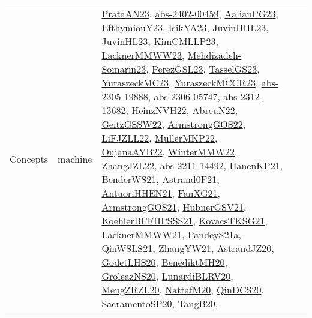 {\begin{longtable}{lp{3cm}>{\raggedright}p{6cm}>{\raggedright}p{6cm}p{8cm}}
Concepts & machine & \href{articles/PrataAN23.pdf}{PrataAN23}\cite{PrataAN23}, \href{articles/abs-2402-00459.pdf}{abs-2402-00459}\cite{abs-2402-00459}, \href{papers/AalianPG23.pdf}{AalianPG23}\cite{AalianPG23}, \href{papers/EfthymiouY23.pdf}{EfthymiouY23}\cite{EfthymiouY23}, \href{articles/IsikYA23.pdf}{IsikYA23}\cite{IsikYA23}, \href{papers/JuvinHHL23.pdf}{JuvinHHL23}\cite{JuvinHHL23}, \href{papers/JuvinHL23.pdf}{JuvinHL23}\cite{JuvinHL23}, \href{papers/KimCMLLP23.pdf}{KimCMLLP23}\cite{KimCMLLP23}, \href{articles/LacknerMMWW23.pdf}{LacknerMMWW23}\cite{LacknerMMWW23}, \href{papers/Mehdizadeh-Somarin23.pdf}{Mehdizadeh-Somarin23}\cite{Mehdizadeh-Somarin23}, \href{papers/PerezGSL23.pdf}{PerezGSL23}\cite{PerezGSL23}, \href{papers/TasselGS23.pdf}{TasselGS23}\cite{TasselGS23}, \href{papers/YuraszeckMC23.pdf}{YuraszeckMC23}\cite{YuraszeckMC23}, \href{articles/YuraszeckMCCR23.pdf}{YuraszeckMCCR23}\cite{YuraszeckMCCR23}, \href{articles/abs-2305-19888.pdf}{abs-2305-19888}\cite{abs-2305-19888}, \href{articles/abs-2306-05747.pdf}{abs-2306-05747}\cite{abs-2306-05747}, \href{articles/abs-2312-13682.pdf}{abs-2312-13682}\cite{abs-2312-13682}, \href{articles/HeinzNVH22.pdf}{HeinzNVH22}\cite{HeinzNVH22}, \href{articles/AbreuN22.pdf}{AbreuN22}\cite{AbreuN22}, \href{papers/GeitzGSSW22.pdf}{GeitzGSSW22}\cite{GeitzGSSW22}, \href{papers/ArmstrongGOS22.pdf}{ArmstrongGOS22}\cite{ArmstrongGOS22}, \href{papers/LiFJZLL22.pdf}{LiFJZLL22}\cite{LiFJZLL22}, \href{articles/MullerMKP22.pdf}{MullerMKP22}\cite{MullerMKP22}, \href{papers/OujanaAYB22.pdf}{OujanaAYB22}\cite{OujanaAYB22}, \href{papers/WinterMMW22.pdf}{WinterMMW22}\cite{WinterMMW22}, \href{papers/ZhangJZL22.pdf}{ZhangJZL22}\cite{ZhangJZL22}, \href{articles/abs-2211-14492.pdf}{abs-2211-14492}\cite{abs-2211-14492}, \href{papers/HanenKP21.pdf}{HanenKP21}\cite{HanenKP21}, \href{papers/BenderWS21.pdf}{BenderWS21}\cite{BenderWS21}, \href{papers/Astrand0F21.pdf}{Astrand0F21}\cite{Astrand0F21}, \href{papers/AntuoriHHEN21.pdf}{AntuoriHHEN21}\cite{AntuoriHHEN21}, \href{articles/FanXG21.pdf}{FanXG21}\cite{FanXG21}, \href{papers/ArmstrongGOS21.pdf}{ArmstrongGOS21}\cite{ArmstrongGOS21}, \href{articles/HubnerGSV21.pdf}{HubnerGSV21}\cite{HubnerGSV21}, \href{articles/KoehlerBFFHPSSS21.pdf}{KoehlerBFFHPSSS21}\cite{KoehlerBFFHPSSS21}, \href{papers/KovacsTKSG21.pdf}{KovacsTKSG21}\cite{KovacsTKSG21}, \href{papers/LacknerMMWW21.pdf}{LacknerMMWW21}\cite{LacknerMMWW21}, \href{articles/PandeyS21a.pdf}{PandeyS21a}\cite{PandeyS21a}, \href{articles/QinWSLS21.pdf}{QinWSLS21}\cite{QinWSLS21}, \href{articles/ZhangYW21.pdf}{ZhangYW21}\cite{ZhangYW21}, \href{articles/AstrandJZ20.pdf}{AstrandJZ20}\cite{AstrandJZ20}, \href{papers/GodetLHS20.pdf}{GodetLHS20}\cite{GodetLHS20}, \href{articles/BenediktMH20.pdf}{BenediktMH20}\cite{BenediktMH20}, \href{papers/GroleazNS20.pdf}{GroleazNS20}\cite{GroleazNS20}, \href{articles/LunardiBLRV20.pdf}{LunardiBLRV20}\cite{LunardiBLRV20}, \href{articles/MengZRZL20.pdf}{MengZRZL20}\cite{MengZRZL20}, \href{papers/NattafM20.pdf}{NattafM20}\cite{NattafM20}, \href{articles/QinDCS20.pdf}{QinDCS20}\cite{QinDCS20}, \href{articles/SacramentoSP20.pdf}{SacramentoSP20}\cite{SacramentoSP20}, \href{papers/TangB20.pdf}{TangB20}\cite{TangB20}, 
\end{longtable}}
